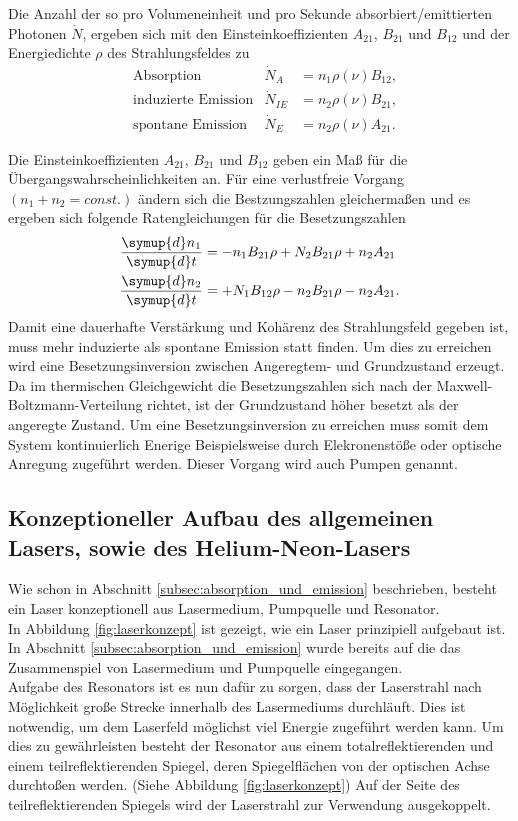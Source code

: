 Die Anzahl der so
pro Volumeneinheit und pro Sekunde
absorbiert/emittierten Photonen $\dot{N}$,
ergeben sich mit den Einsteinkoeffizienten $A_21$, $B_21$ und $B_12$
und der Energiedichte $\rho$ des Strahlungsfeldes zu
\begin{align}
& \text{Absorption}   &\dot{N}_A   &= n_1 \rho(\nu)B_{12},\\
& \text{induzierte Emission}   &\dot{N}_{IE}&= n_2 \rho(\nu)B_{21},\\
& \text{spontane Emission}   &\dot{N}_E   &= n_2 \rho(\nu) A_{21}.
\end{align}

Die Einsteinkoeffizienten $A_21$, $B_21$ und $B_12$
geben ein Maß für die Übergangswahrscheinlichkeiten an.
Für eine verlustfreie Vorgang
$(n_1+n_2=const.)$ ändern sich die Bestzungszahlen
gleichermaßen und es ergeben sich folgende
Ratengleichungen für die Besetzungszahlen
\begin{align}
\frac{\symup{d} n_1}{\symup{d} t} &=-n_1 B_{21}\rho + N_2 B_{21} \rho + n_2 A_{21}\\
\frac{\symup{d} n_2}{\symup{d} t} &=+N_1 B_{12}\rho - n_2 B_{21} \rho - n_2 A_{21}.
\end{align}
Damit eine dauerhafte Verstärkung
und Kohärenz des Strahlungsfeld gegeben ist,
muss mehr induzierte als spontane Emission
statt finden. Um dies zu
erreichen wird eine Besetzungsinversion
zwischen Angeregtem- und Grundzustand
erzeugt.
Da im thermischen Gleichgewicht
die Besetzungszahlen sich nach der
Maxwell-Boltzmann-Verteilung
richtet, ist der Grundzustand höher
besetzt als der angeregte Zustand.
Um eine Besetzungsinversion zu erreichen
muss somit dem System kontinuierlich
Enerige Beispielsweise durch
Elekronenstöße oder
optische Anregung zugeführt werden.
Dieser Vorgang wird auch Pumpen genannt.



\subsection{Konzeptioneller Aufbau des allgemeinen Lasers, sowie des Helium-Neon-Lasers}
\label{subsec:konzeptioneller_aufbau}

Wie schon in Abschnitt \ref{subsec:absorption_und_emission}
beschrieben, besteht ein Laser konzeptionell aus Lasermedium,
Pumpquelle und Resonator.\\
In Abbildung \ref{fig:laserkonzept} ist gezeigt,
wie ein Laser prinzipiell aufgebaut ist.
In Abschnitt \ref{subsec:absorption_und_emission}
wurde bereits auf die das Zusammenspiel von Lasermedium
und Pumpquelle eingegangen.\\
Aufgabe des Resonators ist es nun dafür zu sorgen,
dass der Laserstrahl nach Möglichkeit große Strecke innerhalb
des Lasermediums durchläuft. Dies ist notwendig,
um dem Laserfeld möglichst viel Energie zugeführt
werden kann. Um dies zu gewährleisten besteht der Resonator
aus einem totalreflektierenden und einem teilreflektierenden Spiegel,
deren Spiegelflächen von der optischen Achse durchtoßen werden.
(Siehe Abbildung \ref{fig:laserkonzept})
Auf der Seite des teilreflektierenden Spiegels wird der Laserstrahl
zur Verwendung ausgekoppelt.

